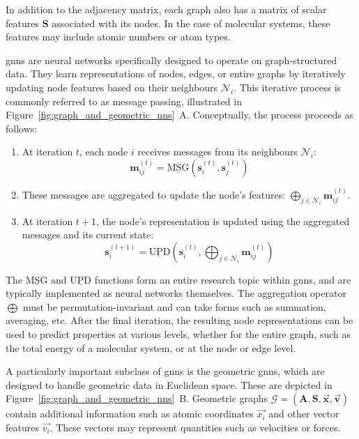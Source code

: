 In addition to the adjacency matrix, each graph also has a matrix of scalar features $\mathbf{S}$ associated with its nodes. In the case of molecular systems, these features may include atomic numbers or atom types.

\Acp{gnn} are neural networks specifically designed to operate on graph-structured data. They learn representations of nodes, edges, or entire graphs by iteratively updating node features based on their neighbours $\mathcal{N}_i$. This iterative process is commonly referred to as message passing, illustrated in Figure~\ref{fig:graph_and_geometric_nns}~A. Conceptually, the process proceeds as follows:
\begin{enumerate}
    \item At iteration $t$, each node $i$ receives messages from its neighbours $\mathcal{N}_i$:
    \begin{equation}
        \mathbf{m}_{ij}^{(t)} = \underline{\text{MSG}}\left(\mathbf{s}_i^{(t)}, \mathbf{s}_j^{(t)}\right)
        \label{eq:message_passing}
    \end{equation}

    \item These messages are aggregated to update the node's features: $\bigoplus_{j \in \mathcal{N}_i} \mathbf{m}_{ij}^{(t)}$.
        
    \item At iteration $t + 1$, the node's representation is updated using the aggregated messages and its current state:
    \begin{equation}
        \mathbf{s}_i^{(t+1)} = \underline{\text{UPD}}\left(\mathbf{s}_i^{(t)}, \bigoplus_{j \in \mathcal{N}_i} \mathbf{m}_{ij}^{(t)}\right)
        \label{eq:representation_update}
    \end{equation}
\end{enumerate}

The $\underline{\text{MSG}}$ and $\underline{\text{UPD}}$ functions form an entire research topic within \acp{gnn}, and are typically implemented as neural networks themselves. The aggregation operator $\bigoplus$ must be permutation-invariant and can take forms such as summation, averaging, etc. After the final iteration, the resulting node representations can be used to predict properties at various levels, whether for the entire graph, such as the total energy of a molecular system, or at the node or edge level.

A particularly important subclass of \acp{gnn} is the geometric \acp{gnn}, which are designed to handle geometric data in Euclidean space. These are depicted in Figure~\ref{fig:graph_and_geometric_nns}~B. Geometric graphs $\mathcal{G} = (\mathbf{A}, \mathbf{S}, \vec{\mathbf{x}}, \vec{\mathbf{v}})$ contain additional information such as atomic coordinates $\vec{x_i}$ and other vector features $\vec{v_i}$. These vectors may represent quantities such as velocities or forces.


